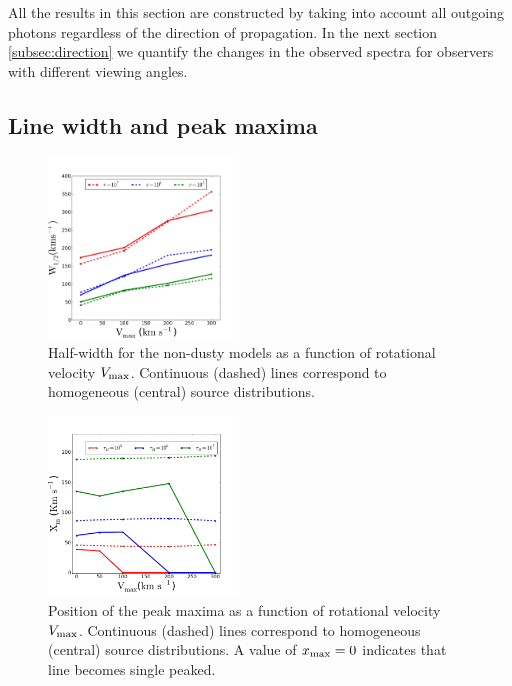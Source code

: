 \documentclass[usenatbib]{mn2e}
\begin{document}
All the results in this section are constructed by taking into
account all outgoing photons regardless of the direction of
propagation. In the next section \ref{subsec:direction} we quantify 
the changes in the observed spectra for observers with different
viewing angles. 

\subsection{Line width and peak maxima}
\label{sec:widthpeak}


\begin{figure}
    \includegraphics[width=0.45\textwidth]{WidthVvsVmax.png}
    \caption{Half-width for the non-dusty models as a function of
      rotational velocity $V_{\rm max}$. Continuous (dashed) lines
      correspond to homogeneous (central) source
      distributions. \label{fig:widthvsvelocity}} 
\end{figure}


\begin{figure}
    \includegraphics[width=0.45\textwidth]{maximumVvsVmax.png}
\caption{Position of the peak maxima as a function of rotational
  velocity $V_{\rm max}$. Continuous (dashed) lines correspond to
  homogeneous (central) source distributions. A value of $x_{\rm
    max}=0$ indicates that line becomes single
  peaked. \label{fig:maximumsvsvelocity}}  
\end{figure}
\end{document}
